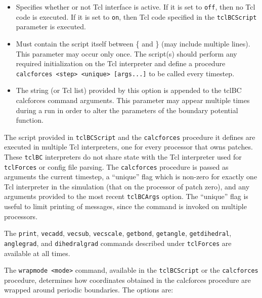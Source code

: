\begin{itemize}

\item
{}
{Specifies whether or not Tcl interface is active.  If it 
is set to {\tt off}, then no Tcl code is executed.  
If it is set to {\tt on}, then Tcl code specified in
the {\tt tclBCScript} parameter is executed.}

\item
{}
{Must contain the script 
itself between \{ and \} (may include multiple lines).
This parameter may occur only once.
The script(s) should perform any required initialization on the Tcl interpreter and define a procedure {\tt calcforces <step> <unique> [args...]} to be called every timestep.
}

\item
{}
{The string (or Tcl list) provided by this option is appended to the
tclBC calcforces command arguments.
This parameter may appear multiple times during a run in order to alter
the parameters of the boundary potential function.
}

\end{itemize}

The script provided in {\tt tclBCScript} and the {\tt calcforces} procedure
it defines are executed in multiple Tcl interpreters, one for every
processor that owns patches.
These {\tt tclBC} interpreters do not share state with the Tcl interpreter used
for {\tt tclForces} or config file parsing.
The {\tt calcforces} procedure is passed as arguments
the current timestep, a ``unique'' flag which is non-zero for exactly
one Tcl interpreter in the simulation (that on the processor of patch zero),
and any arguments provided to the most recent {\tt tclBCArgs} option.
The ``unique'' flag is useful to limit printing of messages, since the
command is invoked on multiple processors.

The {\tt print}, {\tt vecadd}, {\tt vecsub}, {\tt vecscale},
{\tt getbond}, {\tt getangle}, {\tt getdihedral},
{\tt anglegrad}, and {\tt dihedralgrad} commands described under
{\tt tclForces} are available at all times.

The {\tt wrapmode <mode>} command, available in the {\tt tclBCScript} or the
{\tt calcforces} procedure, determines how coordinates obtained in the
calcforces procedure are wrapped around periodic boundaries.  The options
are:

